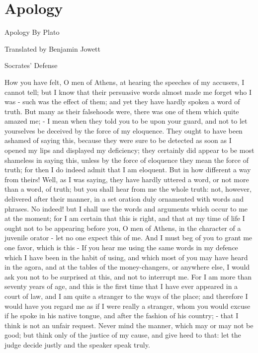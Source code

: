 \chapter{Apology} %
\label{cha:apology}

Apology
By Plato


Translated by Benjamin Jowett

Socrates' Defense

How you have felt, O men of Athens, at hearing the speeches of my
accusers, I cannot tell; but I know that their persuasive words almost
made me forget who I was - such was the effect of them; and yet they
have hardly spoken a word of truth. But many as their falsehoods were,
there was one of them which quite amazed me; - I mean when they told
you to be upon your guard, and not to let yourselves be deceived by
the force of my eloquence. They ought to have been ashamed of saying
this, because they were sure to be detected as soon as I opened my
lips and displayed my deficiency; they certainly did appear to be
most shameless in saying this, unless by the force of eloquence they
mean the force of truth; for then I do indeed admit that I am eloquent.
But in how different a way from theirs! Well, as I was saying, they
have hardly uttered a word, or not more than a word, of truth; but
you shall hear from me the whole truth: not, however, delivered after
their manner, in a set oration duly ornamented with words and phrases.
No indeed! but I shall use the words and arguments which occur to
me at the moment; for I am certain that this is right, and that at
my time of life I ought not to be appearing before you, O men of Athens,
in the character of a juvenile orator - let no one expect this of
me. And I must beg of you to grant me one favor, which is this - If
you hear me using the same words in my defence which I have been in
the habit of using, and which most of you may have heard in the agora,
and at the tables of the money-changers, or anywhere else, I would
ask you not to be surprised at this, and not to interrupt me. For
I am more than seventy years of age, and this is the first time that
I have ever appeared in a court of law, and I am quite a stranger
to the ways of the place; and therefore I would have you regard me
as if I were really a stranger, whom you would excuse if he spoke
in his native tongue, and after the fashion of his country; - that
I think is not an unfair request. Never mind the manner, which may
or may not be good; but think only of the justice of my cause, and
give heed to that: let the judge decide justly and the speaker speak
truly. 

